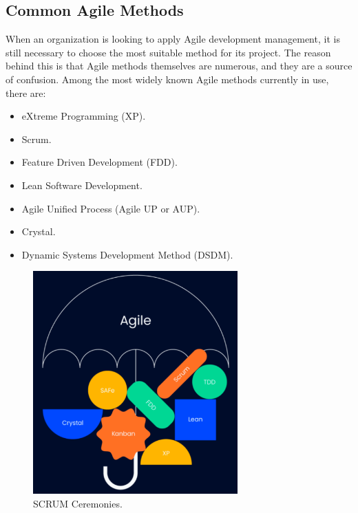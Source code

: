 \subsection{Common Agile Methods}
When an organization is looking to apply Agile development management, it is still necessary to choose the most suitable method for its project. The reason behind this is that Agile methods themselves are numerous, and they are a source of confusion. Among the most widely known Agile methods currently in use, there are:
\begin{itemize}
    \item eXtreme Programming (XP).
    \item Scrum.
    \item Feature Driven Development (FDD).
    \item Lean Software Development.
    \item Agile Unified Process (Agile UP or AUP).
    \item Crystal.
    \item Dynamic Systems Development Method (DSDM).
\end{itemize}
\begin{figure}[h]
    \centering
    \includegraphics[width=0.7\textwidth]{figures/agileUmbrella.png}  %
    \caption{SCRUM Ceremonies.}
    \label{fig:image1}
\end{figure} \ 
\clearpage

